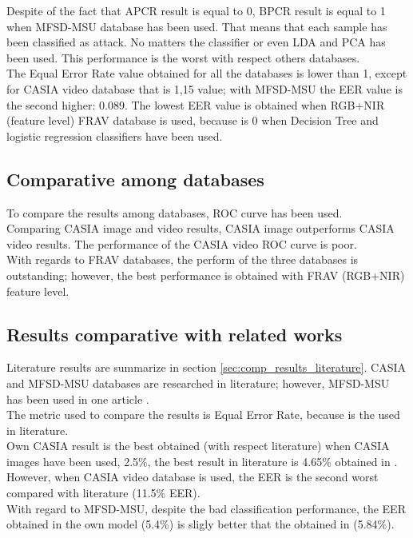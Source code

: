 Despite of the fact that APCR result is equal to 0, BPCR result is equal to 1 when MFSD-MSU database has been used. That means that each sample has been classified as attack. No matters the classifier or even LDA and PCA has been used. This performance is the worst with respect others databases.\\

The Equal Error Rate value obtained for all the databases is lower than 1, except for CASIA video database that is 1,15 value; with MFSD-MSU the EER value is the second higher: 0.089. The lowest EER value is obtained when RGB+NIR (feature level) FRAV database is used, because is 0 when Decision Tree and logistic regression classifiers have been used.

\subsection{Comparative among databases }
To compare the results among databases, ROC curve has been used.\\

Comparing CASIA image and video results, CASIA image outperforms CASIA video results. The performance of the CASIA video ROC curve is poor.\\

With regards to FRAV databases, the perform of the three databases is outstanding; however, the best performance is obtained with FRAV (RGB+NIR) feature level.

\subsection{Results comparative with related works}
Literature results are summarize in section \ref{sec:comp_results_literature}. CASIA and MFSD-MSU databases are researched in literature; however, MFSD-MSU has been used in one article \cite{MSUdatabse}.\\

The metric used to compare the results is Equal Error Rate, because is the used in literature.\\

Own CASIA result is the best obtained (with respect literature) when CASIA images have been used, 2.5\%, the best result in literature is 4.65\% obtained in \cite{yangLL14}. However, when CASIA video database is used, the EER is the second worst compared with literature (11.5\% EER).\\

With regard to MFSD-MSU, despite the bad classification performance, the EER obtained in the own model (5.4\%) is sligly better that the obtained in \cite{MSUdatabse} (5.84\%).
